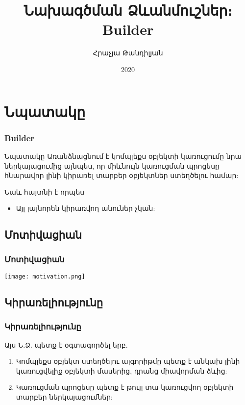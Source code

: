 \documentclass{beamer}
\begin{document}
\title[Builder]{Նախագծման Ձևանմուշներ։ Builder}
\author[Հրաչյա Թանդիլյան\copyright]{Հրաչյա Թանդիլյան}
\date{2020}

\begin{frame}
\titlepage
\end{frame}

\section{Նպատակը}
\begin{frame}\frametitle{Builder}
\begin{block}{Նպատակը}
    Առանձնացնում է կոմպլեքս օբյեկտի կառուցումը նրա ներկայացումից այնպես,
    որ միևնույն կառուցման պրոցեսը հնարավոր լինի կիրառել տարբեր օբյեկտներ ստեղծելու համար:
\end{block}
\vfill
Նաև հայտնի է որպես
\begin{itemize}
    \item Այլ լայնորեն կիրառվող անուներ չկան:
\end{itemize}
\end{frame}

\subsection{Մոտիվացիան}
\begin{frame}\frametitle{Մոտիվացիան}
\begin{center}
    \texttt{[image: motivation.png]}
\end{center}
\end{frame}

\subsection{Կիրառելիությունը}
\begin{frame}\frametitle{Կիրառելիությունը}
Այս Ն.Ձ. պետք է օգտագործել երբ.
\vfill
\begin{enumerate}
    \item Կոմպլեքս օբյեկտ ստեղծելու ալգորիթմը պետք է անկախ լինի կառուցվելիք
    օբյեկտի մասերից, դրանց միավորման ձևից: \pause \vfill
    \item Կառուցման պրոցեսը պետք է թույլ տա կառուցվող օբյեկտի տարբեր ներկայացումներ:
\end{enumerate}
\end{frame}
\end{document}
